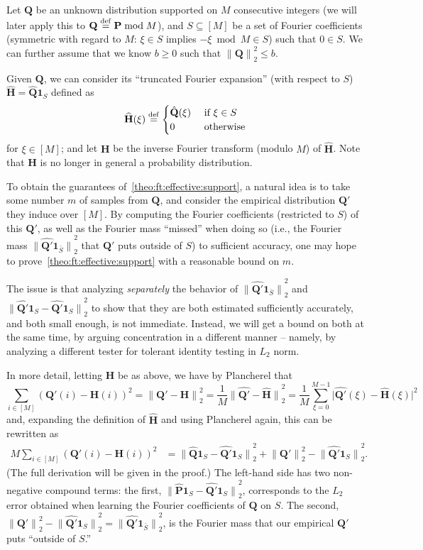 \documentclass[11pt]{article}
\theoremstyle{definition}
\newcommand{\p}{\mathbf{P}}
\newcommand{\q}{\mathbf{Q}}
\newcommand{\h}{\mathbf{H}}
\newcommand{\norm}[1]{\lVert#1\rVert}
\newcommand{\eqdef}{\stackrel{{\mathrm {\footnotesize def}}}{=}}
\newcommand{\normtwo}[1]{{\norm{#1}}_2}
\newcommand{\dabs}[1]{\lvert #1 \rvert}
\newcommand{\fourier}[1]{\widehat{#1}}
\newcommand{\littlesum}{\mathop{\textstyle \sum}}
\begin{document}
\medskip

Let $\q$ be an unknown distribution supported on $M$ consecutive integers (we will later apply this to $\q\eqdef \p \bmod M$), and $S\subseteq[M]$ be a set of Fourier coefficients (symmetric with regard to $M$: $\xi\in S$ implies $-\xi \bmod M \in S$) such that $0\in S$. We can further assume that we know $b\geq 0$ such that $\normtwo{\q}^2 \leq b$.

Given $\q$, we can consider its ``truncated Fourier expansion'' (with respect to $S$) $\fourier{\h}=\hat{\q}\mathbf{1}_{S}$ defined as
\[
    \fourier{\h}(\xi) \eqdef
      \begin{cases}
          \hat{\q}(\xi) & \text{ if } \xi\in S\\
          0 & \text{ otherwise}
      \end{cases}
\]
for $\xi\in[M]$; and let $\h$ be the inverse Fourier transform (modulo $M$) of $\fourier{\h}$. Note that $\h$ is no longer in general a probability distribution.\medskip

To obtain the guarantees of~\cref{theo:ft:effective:support}, a natural idea is to take some number $m$ of samples from $\q$, and consider the empirical distribution $\q'$ they induce over $[M]$. By computing the Fourier coefficients (restricted to $S$) of this $\q'$, as well as the Fourier mass ``missed'' when doing so (i.e., the Fourier mass $\normtwo{\fourier{\q'}\mathbf{1}_{\bar{S}}}^2$ that $\q'$ puts outside of $S$) to sufficient accuracy, one may hope to prove~\cref{theo:ft:effective:support} with a reasonable bound on $m$.

The issue is that analyzing \emph{separately} the behavior of $\normtwo{\fourier{\q'}\mathbf{1}_{\bar{S}}}^2$ and $\normtwo{\fourier{\q'}\mathbf{1}_{S}-\fourier{\q'}\mathbf{1}_{S}}^2$ to show that they are both estimated sufficiently accurately, and both small enough, is not immediate. Instead, we will get a bound on both at the same time, by arguing concentration in a different manner -- namely, by analyzing a different tester for tolerant identity testing in $L_2$ norm.

In more detail, letting $\h$ be as above, we have by Plancherel that
\[
  \littlesum_{i\in [M]} (\q'(i)-\h(i))^2 = \normtwo{\q'-\h}^2 = \frac{1}{M}\normtwo{\fourier{\q'}-\fourier{\h}}^2 = \frac{1}{M}\littlesum_{\xi=0}^{M-1} \dabs{\fourier{\q'}(\xi)-\fourier{\h}(\xi)}^2
\]
and, expanding the definition of $\fourier{\h}$ and using Plancherel again, this can be rewritten as
\begin{align*}
  M\littlesum_{i\in [M]} (\q'(i)-\h(i))^2 &=  \normtwo{\fourier{\q}\mathbf{1}_{S}-\fourier{\q'}\mathbf{1}_{S}}^2 + \normtwo{\q'}^2 - \normtwo{\fourier{\q'}\mathbf{1}_{S}}^2.
\end{align*}
(The full derivation will be given in the proof.) The left-hand side has two non-negative compound terms: the first, $\normtwo{\fourier{\p}\mathbf{1}_{S}-\fourier{\q'}\mathbf{1}_{S}}^2$, corresponds to the $L_2$ error obtained when learning the Fourier coefficients of $\q$ on $S$. The second, $\normtwo{\q'}^2 - \normtwo{\fourier{\q'}\mathbf{1}_{S}}^2 = \normtwo{\fourier{\q'}\mathbf{1}_{\bar{S}}}^2$, is the Fourier mass that our empirical $\q'$ puts ``outside of $S$.''
\end{document}
